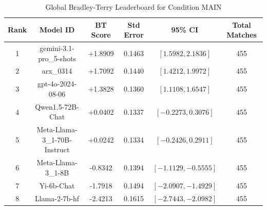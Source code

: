 \begin{table}[ht]
\centering
\caption{Global Bradley-Terry Leaderboard for Condition \textsc{MAIN}}
\label{tab:leaderboard_main}
\begin{tabular}{cccccc}
\hline
\textbf{Rank} & \textbf{Model ID} & \textbf{BT Score} & \textbf{Std Error} & \textbf{95\% CI} & \textbf{Total Matches} \\
\hline
1 & gemini-3.1-pro\_5-shots & +1.8909 & 0.1463 & $[1.5982, 2.1836]$ & 455 \\
2 & arx\_0314 & +1.7092 & 0.1440 & $[1.4212, 1.9972]$ & 455 \\
3 & gpt-4o-2024-08-06 & +1.3828 & 0.1360 & $[1.1108, 1.6547]$ & 455 \\
4 & Qwen1.5-72B-Chat & +0.0402 & 0.1337 & $[-0.2273, 0.3076]$ & 455 \\
5 & Meta-Llama-3\_1-70B-Instruct & +0.0242 & 0.1334 & $[-0.2426, 0.2911]$ & 455 \\
6 & Meta-Llama-3\_1-8B & -0.8342 & 0.1394 & $[-1.1129, -0.5555]$ & 455 \\
7 & Yi-6b-Chat & -1.7918 & 0.1494 & $[-2.0907, -1.4929]$ & 455 \\
8 & Llama-2-7b-hf & -2.4213 & 0.1615 & $[-2.7443, -2.0982]$ & 455 \\
\hline
\end{tabular}
\end{table}
